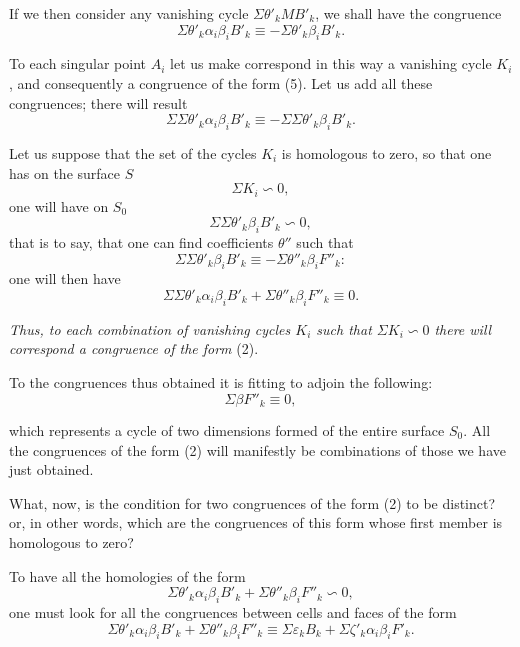 \documentclass{article}
\begin{document}
If we then consider any vanishing cycle $\Sigma \theta'_{k} MB'_{k}$, we shall have the congruence
\[ \Sigma \theta'_{k} \alpha_{i}\beta_{i}B'_{k} \equiv -\Sigma \theta'_{k} \beta_{i}B'_{k}. \tag{5} \]

To each singular point $A_{i}$ let us make correspond in this way a vanishing cycle $K_{i}$, and consequently a congruence of the form (5). Let us add all these congruences; there will result
\[ \Sigma \Sigma \theta'_{k} \alpha_{i}\beta_{i}B'_{k} \equiv -\Sigma \Sigma \theta'_{k} \beta_{i}B'_{k}. \]

Let us suppose that the set of the cycles $K_{i}$ is homologous to zero, so that one has on the surface $S$
\[ \Sigma K_{i} \backsim 0, \]
one will have on $S_{0}$
\[ \Sigma \Sigma \theta'_{k} \beta_{i}B'_{k} \backsim 0, \]
that is to say, that one can find coefficients $\theta''$ such that
\[ \Sigma \Sigma \theta'_{k} \beta_{i}B'_{k} \equiv -\Sigma \theta''_{k} \beta_{i}F''_{k}: \]
one will then have
\[ \Sigma \Sigma \theta'_{k} \alpha_{i}\beta_{i}B'_{k} + \Sigma \theta''_{k} \beta_{i}F''_{k} \equiv 0. \tag{2} \]

\emph{Thus, to each combination of vanishing cycles $K_{i}$ such that $\Sigma K_{i} \backsim 0$ there will correspond a congruence of the form} (2).

To the congruences thus obtained it is fitting to adjoin the following:
\[ \Sigma \beta F''_{k} \equiv 0, \]

which represents a cycle of two dimensions formed of the entire surface $S_{0}$. All the congruences of the form (2) will manifestly be combinations of those we have just obtained.

What, now, is the condition for two congruences of the form (2) to be distinct? or, in other words, which are the congruences of this form whose first member is homologous to zero?

To have all the homologies of the form
\[ \Sigma \theta'_{k} \alpha_{i}\beta_{i}B'_{k} + \Sigma \theta''_{k} \beta_{i}F''_{k} \backsim 0, \]
one must look for all the congruences between cells and faces of the form
\[ \Sigma \theta'_{k} \alpha_{i}\beta_{i}B'_{k} + \Sigma \theta''_{k} \beta_{i}F''_{k} \equiv \Sigma \varepsilon_{k} B_{k} + \Sigma \zeta'_{k} \alpha_{i}\beta_{i}F'_{k}. \tag{6} \]
\end{document}
